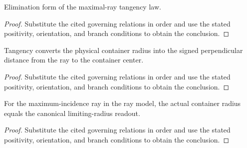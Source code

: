 \begin{lemma}
  \label{lem:physics:IPhO_2026_2_B_1:aux025}
  Elimination form of the maximal-ray tangency law.
\end{lemma}
\begin{proof}
  Substitute the cited governing relations in order and use the stated positivity, orientation, and branch conditions to obtain the conclusion.
\end{proof}

\begin{lemma}
  \label{lem:physics:IPhO_2026_2_B_1:aux026}
  Tangency converts the physical container radius into the signed perpendicular distance from the ray to the container center.
\end{lemma}
\begin{proof}
  Substitute the cited governing relations in order and use the stated positivity, orientation, and branch conditions to obtain the conclusion.
\end{proof}

\begin{lemma}
  \label{lem:physics:IPhO_2026_2_B_1:aux027}
  For the maximum-incidence ray in the ray model, the actual container radius equals the canonical limiting-radius readout.
\end{lemma}
\begin{proof}
  Substitute the cited governing relations in order and use the stated positivity, orientation, and branch conditions to obtain the conclusion.
\end{proof}

